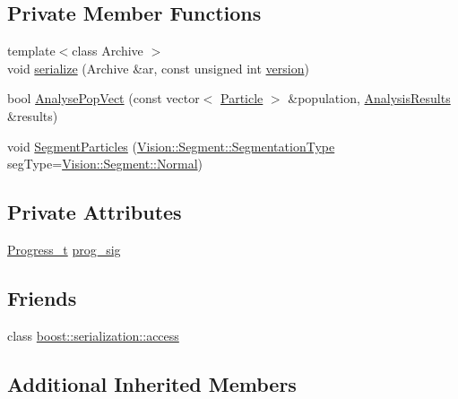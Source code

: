 \subsection*{Private Member Functions}
\begin{DoxyCompactItemize}
\item 
{\footnotesize template$<$class Archive $>$ }\\void \hyperlink{class_soil_analyzer_1_1_sample_a5be6eea7a7d74e0adec741d1e203635e}{serialize} (Archive \&ar, const unsigned int \hyperlink{class_soil_analyzer_1_1_soil_ac32132912c73338edf60b5cd6de4feb8}{version})
\item 
bool \hyperlink{class_soil_analyzer_1_1_sample_ab086f5475a5e404625b6ae1faa0fe7a2}{Analyse\+Pop\+Vect} (const vector$<$ \hyperlink{class_soil_analyzer_1_1_particle}{Particle} $>$ \&population, \hyperlink{class_soil_analyzer_1_1_analysis_results}{Analysis\+Results} \&results)
\item 
void \hyperlink{class_soil_analyzer_1_1_sample_a38d665f29d94e597cb4c6a467d2e1f0b}{Segment\+Particles} (\hyperlink{class_vision_1_1_segment_af3a2b992526eac54bca53e34cf2db4da}{Vision\+::\+Segment\+::\+Segmentation\+Type} seg\+Type=\hyperlink{class_vision_1_1_segment_af3a2b992526eac54bca53e34cf2db4daae000cfc8d629752d6cdbba0d3d750184}{Vision\+::\+Segment\+::\+Normal})
\end{DoxyCompactItemize}
\subsection*{Private Attributes}
\begin{DoxyCompactItemize}
\item 
\hyperlink{class_soil_analyzer_1_1_sample_a28ace3c6ddde646d05a7771b715777d2}{Progress\+\_\+t} \hyperlink{class_soil_analyzer_1_1_sample_aab3a7522152890650245a1f069605a13}{prog\+\_\+sig}
\end{DoxyCompactItemize}
\subsection*{Friends}
\begin{DoxyCompactItemize}
\item 
class \hyperlink{class_soil_analyzer_1_1_sample_ac98d07dd8f7b70e16ccb9a01abf56b9c}{boost\+::serialization\+::access}
\end{DoxyCompactItemize}
\subsection*{Additional Inherited Members}


